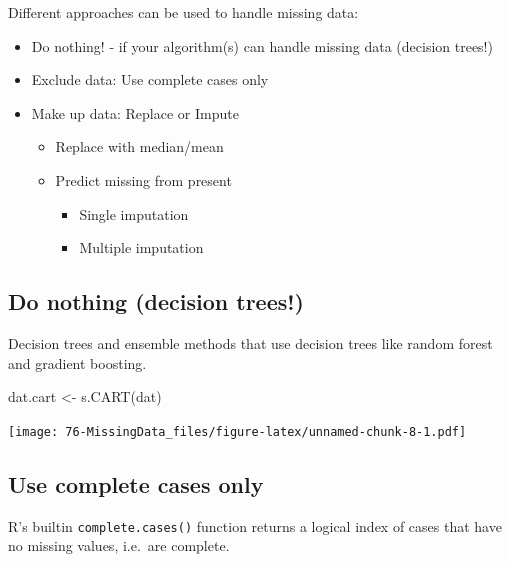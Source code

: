 \documentclass[
]{book}
\newenvironment{Shaded}{\begin{snugshade}}{\end{snugshade}}
\newcommand{\FunctionTok}[1]{\textcolor[rgb]{0.00,0.00,0.00}{#1}}
\newcommand{\NormalTok}[1]{#1}
\newcommand{\OtherTok}[1]{\textcolor[rgb]{0.56,0.35,0.01}{#1}}
\providecommand{\tightlist}{%
  \setlength{\itemsep}{0pt}\setlength{\parskip}{0pt}}
\begin{document}
Different approaches can be used to handle missing data:

\begin{itemize}
\tightlist
\item
  Do nothing! - if your algorithm(s) can handle missing data (decision trees!)
\item
  Exclude data: Use complete cases only
\item
  Make up data: Replace or Impute

  \begin{itemize}
  \tightlist
  \item
    Replace with median/mean
  \item
    Predict missing from present

    \begin{itemize}
    \tightlist
    \item
      Single imputation
    \item
      Multiple imputation
    \end{itemize}
  \end{itemize}
\end{itemize}

\hypertarget{do-nothing-decision-trees}{%
\subsection{Do nothing (decision trees!)}\label{do-nothing-decision-trees}}

Decision trees and ensemble methods that use decision trees like random forest and gradient boosting.

\begin{Shaded}
\begin{Highlighting}[]
\NormalTok{dat.cart }\OtherTok{\textless{}{-}} \FunctionTok{s.CART}\NormalTok{(dat)}
\end{Highlighting}
\end{Shaded}

\texttt{[image: 76-MissingData\_files/figure-latex/unnamed-chunk-8-1.pdf]}

\hypertarget{use-complete-cases-only}{%
\subsection{Use complete cases only}\label{use-complete-cases-only}}

R's builtin \texttt{complete.cases()} function returns a logical index of cases that have no missing values, i.e.~are complete.
\end{document}
